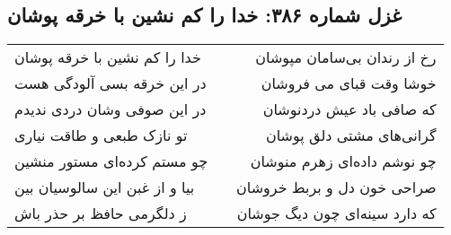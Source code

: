 \begin{center}
\section*{غزل شماره ۳۸۶: خدا را کم نشین با خرقه پوشان}
\label{sec:sh386}
\begin{longtable}{l p{0.5cm} r}
خدا را کم نشین با خرقه پوشان
&&
رخ از رندان بی‌سامان مپوشان
\\
در این خرقه بسی آلودگی هست
&&
خوشا وقت قبای می فروشان
\\
در این صوفی وشان دردی ندیدم
&&
که صافی باد عیش دردنوشان
\\
تو نازک طبعی و طاقت نیاری
&&
گرانی‌های مشتی دلق پوشان
\\
چو مستم کرده‌ای مستور منشین
&&
چو نوشم داده‌ای زهرم منوشان
\\
بیا و از غبن این سالوسیان بین
&&
صراحی خون دل و بربط خروشان
\\
ز دلگرمی حافظ بر حذر باش
&&
که دارد سینه‌ای چون دیگ جوشان
\\
\end{longtable}
\end{center}
